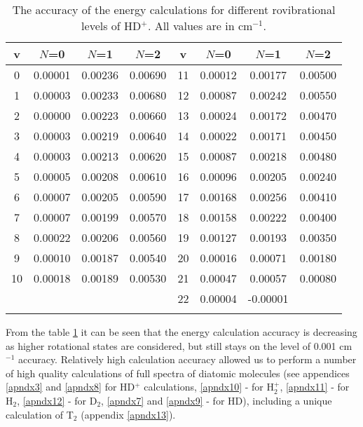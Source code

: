 \begin{table}[t]
\caption[The accuracy of the energy 
calculations for different
rovibrational levels of HD$^+$]{The accuracy of the energy 
calculations for different
rovibrational levels of HD$^+$. All values are in cm$^{-1}$.}
\centering
\def\arraystretch{1.}
\setlength{\tabcolsep}{.75em}
\begin{tabular}{c c c c | c c c c}
\hline \hline
v & $N$=0 & $N$=1 & $N$=2 & v & $N$=0 & $N$=1 & $N$=2  \\
\hline
0	&	0.00001	&	0.00236	&	0.00690	& 11	&	0.00012	&	0.00177	&	0.00500	\\
1	&	0.00003	&	0.00233	&	0.00680	& 12	&	0.00087	&	0.00242	&	0.00550	\\
2	&	0.00000	&	0.00223	&	0.00660	& 13	&	0.00024	&	0.00172	&	0.00470	\\
3	&	0.00003	&	0.00219	&	0.00640	& 14	&	0.00022	&	0.00171	&	0.00450	\\
4	&	0.00003	&	0.00213	&	0.00620	& 15	&	0.00087	&	0.00218	&	0.00480	\\
5	&	0.00005	&	0.00208	&	0.00610	& 16	&	0.00096	&	0.00205	&	0.00240	\\
6	&	0.00007	&	0.00205	&	0.00590	& 17	&	0.00168	&	0.00256	&	0.00410	\\
7	&	0.00007	&	0.00199	&	0.00570	& 18	&	0.00158	&	0.00222	&	0.00400	\\
8	&	0.00022	&	0.00206	&	0.00560	& 19	&	0.00127	&	0.00193	&	0.00350	\\
9	&	0.00010	&	0.00187	&	0.00540	& 20	&	0.00016	&	0.00071	&	0.00180	\\
10	&	0.00018	&	0.00189	&	0.00530	& 21	&	0.00047	&	0.00057	&	0.00080	\\
    &            &           &           & 22	&	0.00004	&	-0.00001	&	     \\
\hline
\label{table_energy}
\end{tabular}
\end{table}

From the table \ref{table_energy} it can be seen that the energy calculation
accuracy is decreasing as higher rotational states are considered, but still
stays on the level of 0.001 cm$^{-1}$ accuracy.
Relatively high calculation accuracy allowed us to perform a number
of high quality calculations of full spectra of diatomic molecules
(see appendices \ref{apndx3} and \ref{apndx8} for HD$^+$ calculations, 
\ref{apndx10} - for H$_2^+$, \ref{apndx11} - for H$_2$, \ref{apndx12} - 
for D$_2$, \ref{apndx7} and \ref{apndx9} - for HD), including 
a unique calculation of T$_2$ (appendix \ref{apndx13}). 

